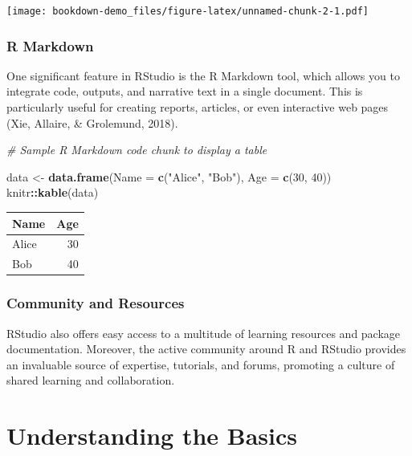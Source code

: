 \documentclass[
  b5paper]{book}
\newenvironment{Shaded}{\begin{snugshade}}{\end{snugshade}}
\newcommand{\AttributeTok}[1]{\textcolor[rgb]{0.13,0.29,0.53}{#1}}
\newcommand{\CommentTok}[1]{\textcolor[rgb]{0.56,0.35,0.01}{\textit{#1}}}
\newcommand{\DecValTok}[1]{\textcolor[rgb]{0.00,0.00,0.81}{#1}}
\newcommand{\FunctionTok}[1]{\textcolor[rgb]{0.13,0.29,0.53}{\textbf{#1}}}
\newcommand{\NormalTok}[1]{#1}
\newcommand{\OtherTok}[1]{\textcolor[rgb]{0.56,0.35,0.01}{#1}}
\newcommand{\SpecialCharTok}[1]{\textcolor[rgb]{0.81,0.36,0.00}{\textbf{#1}}}
\newcommand{\StringTok}[1]{\textcolor[rgb]{0.31,0.60,0.02}{#1}}
\begin{document}
\texttt{[image: bookdown-demo\_files/figure-latex/unnamed-chunk-2-1.pdf]}

\hypertarget{r-markdown}{%
\subsubsection*{R Markdown}\label{r-markdown}}

One significant feature in RStudio is the R Markdown tool, which allows you to integrate code, outputs, and narrative text in a single document. This is particularly useful for creating reports, articles, or even interactive web pages (Xie, Allaire, \& Grolemund, 2018).

\begin{Shaded}
\begin{Highlighting}[]
\CommentTok{\# Sample R Markdown code chunk to display a table}

\NormalTok{data }\OtherTok{\textless{}{-}} \FunctionTok{data.frame}\NormalTok{(}\AttributeTok{Name =} \FunctionTok{c}\NormalTok{(}\StringTok{"Alice"}\NormalTok{, }\StringTok{"Bob"}\NormalTok{), }\AttributeTok{Age =} \FunctionTok{c}\NormalTok{(}\DecValTok{30}\NormalTok{, }\DecValTok{40}\NormalTok{))}
\NormalTok{knitr}\SpecialCharTok{::}\FunctionTok{kable}\NormalTok{(data)}
\end{Highlighting}
\end{Shaded}

\begin{tabular}{l|r}
\hline
Name & Age\\
\hline
Alice & 30\\
\hline
Bob & 40\\
\hline
\end{tabular}

\hypertarget{community-and-resources}{%
\subsubsection*{Community and Resources}\label{community-and-resources}}

RStudio also offers easy access to a multitude of learning resources and package documentation. Moreover, the active community around R and RStudio provides an invaluable source of expertise, tutorials, and forums, promoting a culture of shared learning and collaboration.

\hypertarget{understanding-the-basics}{%
\section{Understanding the Basics}\label{understanding-the-basics}}
\end{document}
